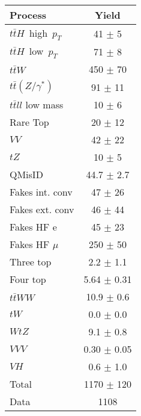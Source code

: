 \begin{center}
\begin{tabular}{|l|c|}
\hline 
Process & {Yield}\\
\hline 
  $t\bar{t}H$\ high\ $p_T$   & 41 $\pm$ 5 \\ 
  $t\bar{t}H$\ low\ $p_T$   & 71 $\pm$ 8 \\ 
  $t\bar{t}W$   & 450 $\pm$ 70 \\ 
  $t\bar{t}(Z/\gamma^*)$   & 91 $\pm$ 11 \\ 
  $t\bar{t}ll$ low mass   & 10 $\pm$ 6 \\ 
  Rare Top   & 20 $\pm$ 12 \\ 
  $VV$   & 42 $\pm$ 22 \\ 
  $tZ$   & 10 $\pm$ 5 \\ 
  QMisID   & 44.7 $\pm$ 2.7 \\ 
  Fakes int. conv & 47 $\pm$ 26 \\
  Fakes ext. conv & 46 $\pm$ 44 \\
  Fakes HF e & 45 $\pm$ 23 \\
  Fakes HF $\mu$ & 250 $\pm$ 50 \\
  Three top   & 2.2 $\pm$ 1.1 \\ 
  Four top   & 5.64 $\pm$ 0.31 \\ 
  $t\bar{t}WW$   & 10.9 $\pm$ 0.6 \\ 
  $tW$   & 0.0 $\pm$ 0.0 \\ 
  $WtZ$   & 9.1 $\pm$ 0.8 \\ 
  $VVV$   & 0.30 $\pm$ 0.05 \\ 
  $VH$   & 0.6 $\pm$ 1.0 \\ 
\hline 
  Total  & 1170 $\pm$ 120 \\ 
\hline 
  Data   & 1108 \\ 
\hline 
\end{tabular} 
\end{center} 
